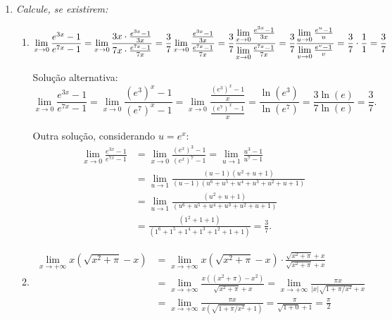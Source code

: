 \documentclass[12pt,a4paper]{article}
\begin{document}
\begin{enumerate}
\item \textit{Calcule, se existirem:}
\begin{enumerate}
\item
\[
\lim\limits_{x\to 0} \frac{e^{3x}-1}{e^{7x}-1}
  = \lim\limits_{x\to 0} \frac{3x \cdot \frac{e^{3x}-1}{3x}}{7x \cdot \frac{e^{7x}-1}{7x}}
  = \frac{3}{7}\lim\limits_{x\to 0} \frac{\frac{e^{3x}-1}{3x}}{\frac{e^{7x}-1}{7x}}
  = \frac{3}{7}\frac{\lim\limits_{x\to 0} \frac{e^{3x}-1}{3x}}{\lim\limits_{x\to 0} \frac{e^{7x}-1}{7x}}
  = \frac{3}{7}\frac{\lim\limits_{u\to 0} \frac{e^{u}-1}{u}}{\lim\limits_{v\to 0} \frac{e^{v}-1}{v}}
  = \frac{3}{7} \cdot \frac{1}{1}
  = \frac{3}{7}\\
\]

Solução alternativa:
\[
\lim\limits_{x\to 0} \frac{e^{3x}-1}{e^{7x}-1}
  = \lim\limits_{x\to 0} \frac{(e^3)^x-1}{(e^7)^x-1}
  = \lim\limits_{x\to 0} \frac{\frac{(e^3)^x-1}{x}}{\frac{(e^7)^x-1}{x}}
  = \frac{\ln(e^3)}{\ln(e^7)}
  = \frac{3 \ln(e)}{7\ln(e)}
  = \frac{3}{7}.
\]

Outra solução, considerando $u=e^x$:
\begin{align*}
\lim\limits_{x\to 0} \frac{e^{3x}-1}{e^{7x}-1}
& = \lim\limits_{x\to 0} \frac{(e^x)^3-1}{(e^x)^7-1}
  = \lim\limits_{u\to 1} \frac{u^3-1}{u^7-1} \\
& = \lim\limits_{u\to 1} \frac{(u-1)(u^2 + u + 1)}{(u-1)(u^6 + u^5 + u^4 + u^3 + u^2 + u + 1)} \\
& = \lim\limits_{u\to 1} \frac{(u^2 + u + 1)}{(u^6 + u^5 + u^4 + u^3 + u^2 + u + 1)} \\
& = \frac{(1^2 + 1 + 1)}{(1^6 + 1^5 + 1^4 + 1^3 + 1^2 + 1 + 1)}
  = \frac{3}{7}.
\end{align*}

\item
\begin{align*}
\lim\limits_{x\to +\infty} x(\sqrt{x^2 + \pi} - x)
& = \lim\limits_{x\to +\infty} x(\sqrt{x^2 + \pi} - x) \cdot \frac{\sqrt{x^2 + \pi} + x}{\sqrt{x^2 + \pi} + x} \\
& = \lim\limits_{x\to +\infty} \frac{x((x^2 + \pi) - x^2)}{\sqrt{x^2 + \pi} + x}
  = \lim\limits_{x\to +\infty} \frac{\pi x}{|x|\sqrt{1 + \pi/x^2} + x} \\
& = \lim\limits_{x\to +\infty} \frac{\pi x}{x (\sqrt{1 + \pi/x^2} + 1)}
  = \frac{\pi}{\sqrt{1 + 0} + 1}
  = \frac{\pi}{2}
\end{align*}
\end{enumerate}
\end{enumerate}
\end{document}
